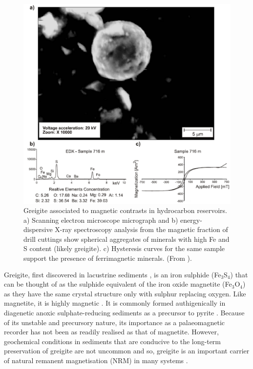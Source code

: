 \begin{figure}
\centering
\includegraphics[width=\textwidth]{intro/figs/framboid_oil.pdf}
\caption[Greigite associated to hydrocarbon related magnetic contrasts]{Greigite associated to magnetic contrasts in hydrocarbon reservoirs. a) Scanning electron microscope micrograph and b) energy-dispersive X-ray spectroscopy analysis from the magnetic fraction of drill cuttings show spherical aggregates of minerals with high Fe and S content (likely greigite). c) Hysteresis curves for the same sample support the presence of ferrimagnetic minerals. (From \citet{Guzman2011}).}
\label{fram_oil}
\end{figure}
\par

Greigite, first discovered in lacustrine sediments \citep{Skinner1964}, is an iron sulphide (Fe$_3$S$_4$) that can be thought of as the sulphide equivalent of the iron oxide magnetite (Fe$_3$O$_4$) as they have the same crystal structure only with sulphur replacing oxygen. Like magnetite, it is highly magnetic \citep{Li2014}. It is commonly formed authigenically in diagenetic anoxic sulphate-reducing sediments \citep{Roberts2011} as a precursor to pyrite \citep{Berner1984,Hunger2007}. Because of its unstable and precursory nature, its importance as a palaeomagnetic recorder has not been as readily realised as that of magnetite. However, geochemical conditions in sediments that are conducive to the long-term preservation of greigite are not uncommon \citep{Roberts2011,Roberts2015} and so, greigite is an important carrier of natural remanent magnetisation (NRM) in many systems \citep{Reynolds1994,Snowball1997,Ron2007,Roberts2010}.\par

